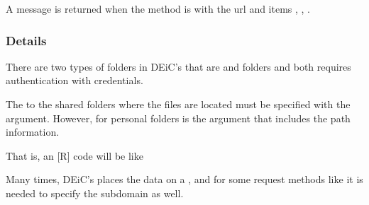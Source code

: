 \documentclass[a4paper,12pt,english]{sphinxhowto}
\begin{document}
A  message is returned when the method is  with the url and items
, , .



\subsubsection{Details}
\label{\detokenize{Sciencedata_dk:details}}
There are two types of folders in DEiC’s  that are 
and  folders and both requires authentication with credentials.

The  to the shared folders where the files are located must be specified with the  argument.
However, for personal folders is the  argument that includes the path information.

That is, an {[}R{]} code will be like

\begin{sphinxVerbatim}[commandchars=\\\{\},formatcom=\footnotesize]
 

  
\end{sphinxVerbatim}

Many times, DEiC’s  places the data on a , and
for some request methods like  it is needed to specify the subdomain as well.

\end{document}
